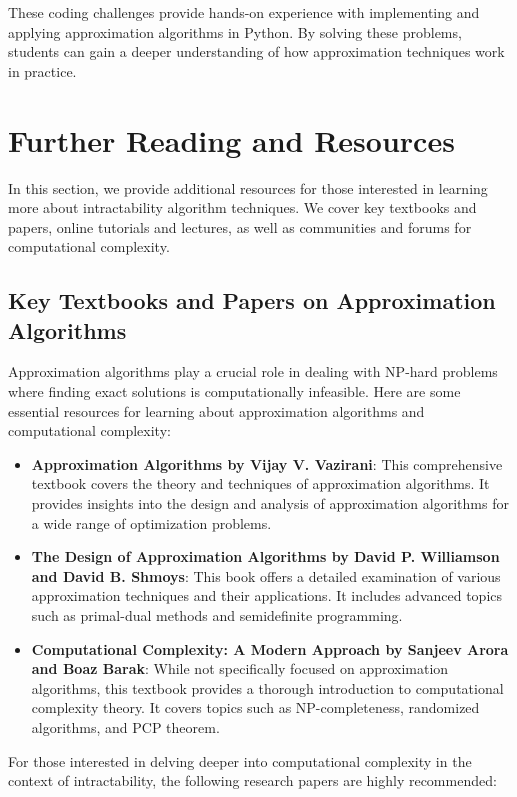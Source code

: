 \documentclass[12pt]{book} %
\begin{document}
These coding challenges provide hands-on experience with implementing and applying approximation algorithms in Python. By solving these problems, students can gain a deeper understanding of how approximation techniques work in practice.


\section{Further Reading and Resources}
In this section, we provide additional resources for those interested in learning more about intractability algorithm techniques. We cover key textbooks and papers, online tutorials and lectures, as well as communities and forums for computational complexity.

\subsection{Key Textbooks and Papers on Approximation Algorithms}
Approximation algorithms play a crucial role in dealing with NP-hard problems where finding exact solutions is computationally infeasible. Here are some essential resources for learning about approximation algorithms and computational complexity:

\begin{itemize}
    \item \textbf{Approximation Algorithms by Vijay V. Vazirani}: This comprehensive textbook covers the theory and techniques of approximation algorithms. It provides insights into the design and analysis of approximation algorithms for a wide range of optimization problems.
    
    \item \textbf{The Design of Approximation Algorithms by David P. Williamson and David B. Shmoys}: This book offers a detailed examination of various approximation techniques and their applications. It includes advanced topics such as primal-dual methods and semidefinite programming.
    
    \item \textbf{Computational Complexity: A Modern Approach by Sanjeev Arora and Boaz Barak}: While not specifically focused on approximation algorithms, this textbook provides a thorough introduction to computational complexity theory. It covers topics such as NP-completeness, randomized algorithms, and PCP theorem.
\end{itemize}

For those interested in delving deeper into computational complexity in the context of intractability, the following research papers are highly recommended:
\end{document}
